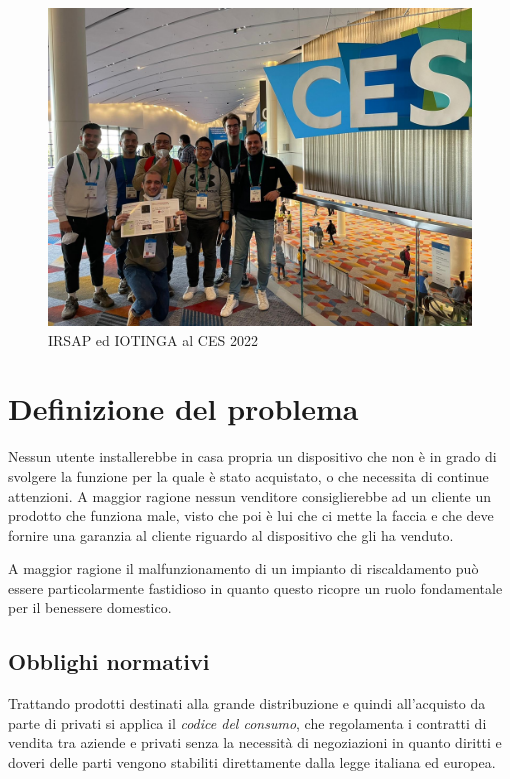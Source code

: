 \documentclass[12pt,a4paper,twoside,titlepage]{book}
\begin{document}
\begin{figure}[ht]
    \centering
    \includegraphics[width=12cm]{img/ces.jpeg}
    \caption{IRSAP ed IOTINGA al CES 2022}
    \label{fig:ces}
\end{figure}

\chapter{Definizione del problema}

Nessun utente installerebbe in casa propria un dispositivo che non è in grado di svolgere la funzione 
per la quale è stato acquistato, o che necessita di continue attenzioni.
A maggior ragione nessun venditore consiglierebbe ad un cliente un prodotto che funziona male, 
visto che poi è lui che ci mette la faccia e che deve fornire una garanzia al cliente riguardo 
al dispositivo che gli ha venduto. 

A maggior ragione il malfunzionamento di un impianto di riscaldamento può essere particolarmente 
fastidioso in quanto questo ricopre un ruolo fondamentale per il benessere domestico.

\section{Obblighi normativi}

Trattando prodotti destinati alla grande distribuzione e quindi all'acquisto da parte 
di privati si applica il \textit{codice del consumo}, che regolamenta i contratti di vendita
tra aziende e privati senza la necessità di negoziazioni in quanto diritti e doveri delle parti 
vengono stabiliti direttamente dalla legge italiana ed europea.
\end{document}
